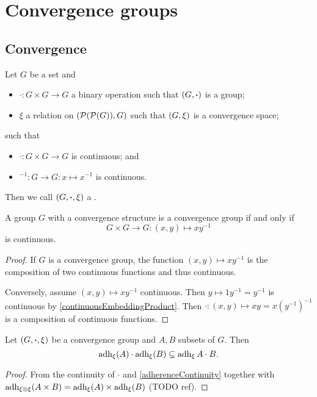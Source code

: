 \section{Convergence groups}
\subsection{Convergence}
\begin{definition}
Let $G$ be a set and
\begin{itemize}
\item $\boldsymbol{\cdot}: G\times G \to G$ a binary operation such that $\left( G, \boldsymbol{\cdot} \right)$ is a group;
\item $\xi$ a relation on $(\operatorname{\mathcal{P}}(\operatorname{\mathcal{P}}(G)), G)$ such that $\left( G, \xi \right)$ is a convergence space;
\end{itemize}
such that
\begin{itemize}
\item $\boldsymbol{\cdot}: G\times G \to G$ is continuous; and
\item $^{-1}: G\to G: x\mapsto x^{-1}$ is continuous.
\end{itemize}
Then we call $\left( G, \boldsymbol{\cdot}, \xi \right)$ a .
\end{definition}

\begin{lemma} \label{convergenceGroupCriterion}
A group $G$ with a convergence structure is a convergence group \textup{if and only if}
\[ G\times G \to G: (x,y) \mapsto xy^{-1} \]
is continuous.
\end{lemma}
\begin{proof}
If $G$ is a convergence group, the function $(x,y) \mapsto xy^{-1}$ is the composition of two continuous functions and thus continuous.

Conversely, assume $(x,y) \mapsto xy^{-1}$ continuous. Then $y \mapsto 1y^{-1} = y^{-1}$ is continuous by \ref{continuousEmbeddingProduct}. Then $\boldsymbol{\cdot}: (x,y) \mapsto xy = x(y^{-1})^{-1}$ is a composition of continuous functions.
\end{proof}

\begin{lemma} \label{closureGroupOperation}
Let $\left( G, \boldsymbol{\cdot}, \xi \right)$ be a convergence group and $A,B$ subsets of $G$. Then
\[ \operatorname{adh}_\xi(A)\cdot \operatorname{adh}_\xi(B) \subseteq \operatorname{adh}_\xi{A\cdot B}. \]
\end{lemma}
\begin{proof}
From the continuity of $\cdot$ and \ref{adherenceContinuity} together with $\operatorname{adh}_{\xi\otimes\xi}(A\times B) = \operatorname{adh}_\xi(A)\times \operatorname{adh}_\xi(B)$ (TODO ref).
\end{proof}

